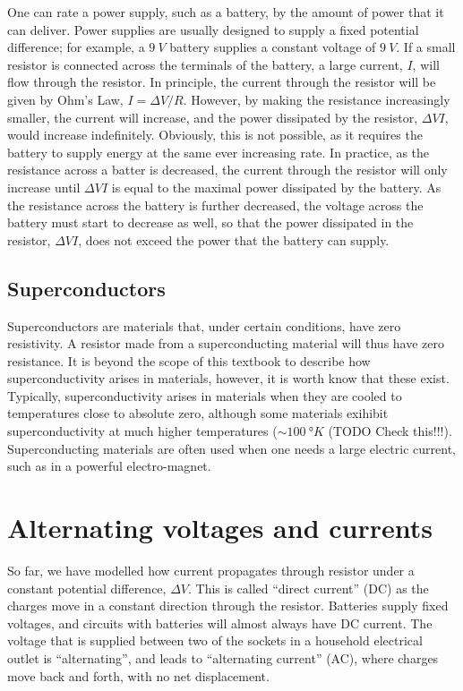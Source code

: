 One can rate a power supply, such as a battery, by the amount of power that it can deliver. Power supplies are usually designed to supply a fixed potential difference; for example, a $\SI{9}{V}$ battery supplies a constant voltage of $\SI{9}{V}$. If a small resistor is connected across the terminals of the battery, a large current, $I$, will flow through the resistor. In principle, the current through the resistor will be given by Ohm's Law, $I=\Delta V/R$. However, by making the resistance increasingly smaller, the current will increase, and the power dissipated by the resistor, $\Delta V I$, would increase indefinitely. Obviously, this is not possible, as it requires the battery to supply energy at the same ever increasing rate. In practice, as the resistance across a batter is decreased, the current through the resistor will only increase until $\Delta V I$ is equal to the maximal power dissipated by the battery. As the resistance across the battery is further decreased, the voltage across the battery must start to decrease as well, so that the power dissipated in the resistor, $\Delta V I$, does not exceed the power that the battery can supply.

\subsection{Superconductors}
Superconductors are materials that, under certain conditions, have zero resistivity. A resistor made from a superconducting material will thus have zero resistance. It is beyond the scope of this textbook to describe how superconductivity arises in materials, however, it is worth know that these exist. Typically, superconductivity arises in materials when they are cooled to temperatures close to absolute zero, although some materials exihibit superconductivity at much higher temperatures ($\sim\SI{100}{\degree K}$ (TODO Check this!!!). Superconducting materials are often used when one needs a large electric current, such as in a powerful electro-magnet.

                                                         
\section{Alternating voltages and currents}
So far, we have modelled how current propagates through  resistor under a constant potential difference, $\Delta V$. This is called ``direct current'' (DC) as the charges move in a constant direction through the resistor. Batteries supply fixed voltages, and circuits with batteries will almost always have DC current. The voltage that is supplied between two of the sockets in a household electrical outlet is ``alternating'', and leads to ``alternating current'' (AC), where charges move back and forth, with no net displacement. 

